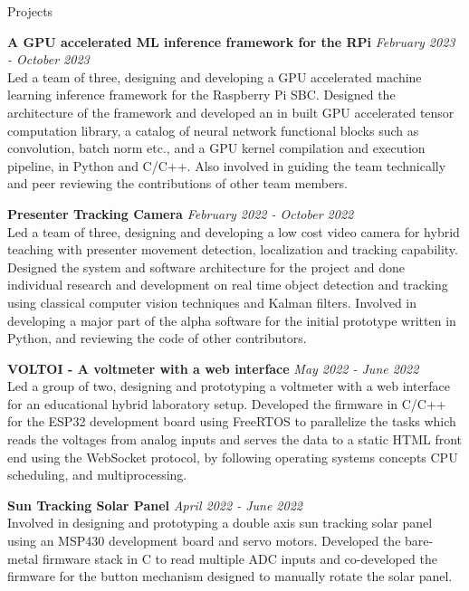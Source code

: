 \documentclass[
	11pt, %
]{./assets/resume} %
\begin{document}

\begin{rSection}{Projects}

{\bf A GPU accelerated ML inference framework for the RPi} \hfill {\em February 2023 - October 2023} \\
Led a team of three, designing and developing a GPU accelerated machine learning inference framework for the Raspberry Pi SBC. Designed the architecture of the framework and developed an in built GPU accelerated tensor computation library, a catalog of neural network functional blocks such as convolution, batch norm etc., and a GPU kernel compilation and execution pipeline, in Python and C/C++. Also involved in guiding the team technically and peer reviewing the contributions of other team members.

{\bf Presenter Tracking Camera} \hfill {\em February 2022 - October 2022} \\
Led a team of three, designing and developing a low cost video camera for hybrid teaching with presenter movement detection, localization and tracking capability. Designed the system and software architecture for the project and done individual research and development on real time object detection and tracking using classical computer vision techniques and Kalman filters. Involved in developing a major part of the alpha software for the initial prototype written in Python, and reviewing the code of other contributors.

{\bf VOLTOI - A voltmeter with a web interface} \hfill {\em May 2022 - June 2022} \\
Led a group of two, designing and prototyping a voltmeter with a web interface for an educational hybrid laboratory setup. Developed the firmware in C/C++ for the ESP32 development board using FreeRTOS to parallelize the tasks which reads the voltages from analog inputs and serves the data to a static HTML front end using the WebSocket protocol, by following operating systems concepts CPU scheduling, and multiprocessing.

{\bf Sun Tracking Solar Panel} \hfill {\em April 2022 - June 2022} \\
Involved in designing and prototyping a double axis sun tracking solar panel using an MSP430 development board and servo motors. Developed the bare-metal firmware stack in C to read multiple ADC inputs and co-developed the firmware for the button mechanism designed to manually rotate the solar panel.


\end{rSection}
\end{document}
